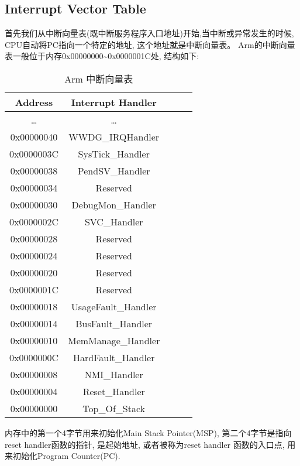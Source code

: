 \subsection{Interrupt Vector Table}
首先我们从中断向量表(既中断服务程序入口地址)开始,当中断或异常发生的时候, CPU自动将PC指向一个特定的地址, 这个地址就是中断向量表。 Arm的中断向量表一般位于内存0x00000000\textasciitilde0x0000001C处, 结构如下:
\begin{table}[htbp]
    \caption{ Arm 中断向量表}\label{tab:table1}
    \vspace{0.5em}\centering\wuhao
    \begin{tabular}{ccccc}
    \toprule[1.5pt]
    Address & Interrupt Handler \\
    \midrule[1pt]
    \dots & \dots \\
    0x00000040 & WWDG\_IRQHandler \\
    0x0000003C & SysTick\_Handler \\
    0x00000038 & PendSV\_Handler \\
    0x00000034 & Reserved \\
    0x00000030 & DebugMon\_Handler \\
    0x0000002C & SVC\_Handler \\
    0x00000028 & Reserved \\
    0x00000024 & Reserved \\
    0x00000020 & Reserved \\
    0x0000001C & Reserved \\
    0x00000018 & UsageFault\_Handler \\
    0x00000014 & BusFault\_Handler \\
    0x00000010 & MemManage\_Handler \\
    0x0000000C & HardFault\_Handler \\
    0x00000008 & NMI\_Handler \\
    0x00000004 & Reset\_Handler \\
    0x00000000 & Top\_Of\_Stack \\
    \bottomrule[1.5pt]
    \end{tabular}
    \vspace{\baselineskip}
    \end{table}

内存中的第一个4字节用来初始化Main Stack Pointer(MSP), 第二个4字节是指向reset handler函数的指针, 是起始地址, 或者被称为reset handler 函数的入口点, 用来初始化Program Counter(PC).
